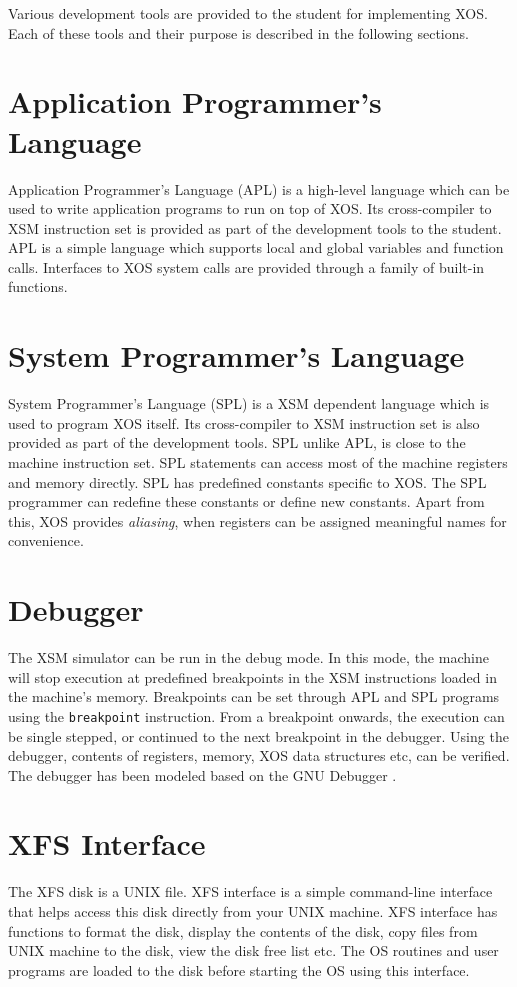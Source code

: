 \documentclass[10pt]{report}
\begin{document}
Various development tools are provided to the student for implementing XOS. Each of these tools and their purpose is described in the following sections. 


\section{Application Programmer's Language}
Application Programmer's Language (APL) is a high-level language which can be used to write application programs to run on top of XOS. Its cross-compiler to XSM instruction set is provided as part of the development tools to the student. APL is a simple language which supports local and global variables and function calls. Interfaces to XOS system calls are provided through a family of built-in functions. \\


\section{System Programmer's Language}
System Programmer's Language (SPL) is a XSM dependent language which is used to program XOS itself. Its cross-compiler to XSM instruction set is also provided as part of the development tools. SPL unlike APL, is close to the machine instruction set. SPL statements can access most of the machine registers and memory directly. SPL has predefined constants specific to XOS. The SPL programmer can redefine these constants or define new constants. Apart from this, XOS provides \textit{aliasing}, when registers can be assigned meaningful names for convenience.\\


\section{Debugger}
The XSM simulator can be run in the debug mode. In this mode, the machine will stop execution at predefined breakpoints in the XSM instructions loaded in the machine's memory. Breakpoints can be set through APL and SPL programs using the \texttt{breakpoint} instruction. From a breakpoint onwards, the execution can be single stepped, or continued to the next breakpoint in the debugger. Using the debugger, contents of registers, memory, XOS data structures etc, can be verified. The debugger has been modeled based on the GNU Debugger \cite{gdb}.\\


\section{XFS Interface}
The XFS disk is a UNIX file. XFS interface is a simple command-line interface that helps access this disk directly from your UNIX machine. XFS interface has functions to format the disk, display the contents of the disk, copy files from UNIX machine to the disk, view the disk free list etc. The OS routines and user programs are loaded to the disk before starting the OS using this interface.\\
\end{document}
